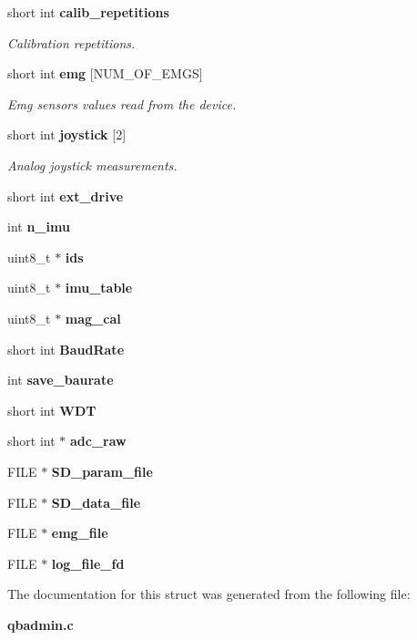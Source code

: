 \begin{DoxyCompactItemize}
\mbox{\label{structglobal__args_a97358fe57110982e565254fa7310cf8f}} 
short int \textbf{ calib\+\_\+repetitions}
\begin{DoxyCompactList}\small\item\em Calibration repetitions. \end{DoxyCompactList}\item 
\mbox{\label{structglobal__args_ac99613e9febb46b081ae696a20e34c62}} 
short int \textbf{ emg} [N\+U\+M\+\_\+\+O\+F\+\_\+\+E\+M\+GS]
\begin{DoxyCompactList}\small\item\em Emg sensors values read from the device. \end{DoxyCompactList}\item 
\mbox{\label{structglobal__args_a0cace64ae2459f06bc0bda1979b0c06f}} 
short int \textbf{ joystick} [2]
\begin{DoxyCompactList}\small\item\em Analog joystick measurements. \end{DoxyCompactList}\item 
\mbox{\label{structglobal__args_af848f8d2dca8dfbccc182293c8ba25bf}} 
short int {\bfseries ext\+\_\+drive}
\item 
\mbox{\label{structglobal__args_ae50c6d44444a5d147ccf31081e10bc85}} 
int {\bfseries n\+\_\+imu}
\item 
\mbox{\label{structglobal__args_ae3def1b858fcea933e43d272cc37b712}} 
uint8\+\_\+t $\ast$ {\bfseries ids}
\item 
\mbox{\label{structglobal__args_a3c9b4fd20398502b26a9f5d6e520b580}} 
uint8\+\_\+t $\ast$ {\bfseries imu\+\_\+table}
\item 
\mbox{\label{structglobal__args_a1bc693ca600ac57486bf05378ed1ccd8}} 
uint8\+\_\+t $\ast$ {\bfseries mag\+\_\+cal}
\item 
\mbox{\label{structglobal__args_a8f68c2db71004b2beac47c7ce6feb94c}} 
short int {\bfseries Baud\+Rate}
\item 
\mbox{\label{structglobal__args_a15a8bc4e37e5294ee939c1dd620095a8}} 
int {\bfseries save\+\_\+baurate}
\item 
\mbox{\label{structglobal__args_abd2a5fb7d2e58a98c4394067565b5492}} 
short int {\bfseries W\+DT}
\item 
\mbox{\label{structglobal__args_a42727c6cdc43ea724e43e8c905defc4e}} 
short int $\ast$ {\bfseries adc\+\_\+raw}
\item 
\mbox{\label{structglobal__args_a77465fe4493fad8152b0516e496ca472}} 
F\+I\+LE $\ast$ {\bfseries S\+D\+\_\+param\+\_\+file}
\item 
\mbox{\label{structglobal__args_a24c393283c73c2307fefcb2107e64761}} 
F\+I\+LE $\ast$ {\bfseries S\+D\+\_\+data\+\_\+file}
\item 
\mbox{\label{structglobal__args_ac3ca959d3b7ae254f86531e0b82affcb}} 
F\+I\+LE $\ast$ {\bfseries emg\+\_\+file}
\item 
\mbox{\label{structglobal__args_a5fbba9db8f8d479d7607ec6e8617026a}} 
F\+I\+LE $\ast$ {\bfseries log\+\_\+file\+\_\+fd}
\end{DoxyCompactItemize}


The documentation for this struct was generated from the following file\+:\begin{DoxyCompactItemize}
\item 
\textbf{ qbadmin.\+c}\end{DoxyCompactItemize}
